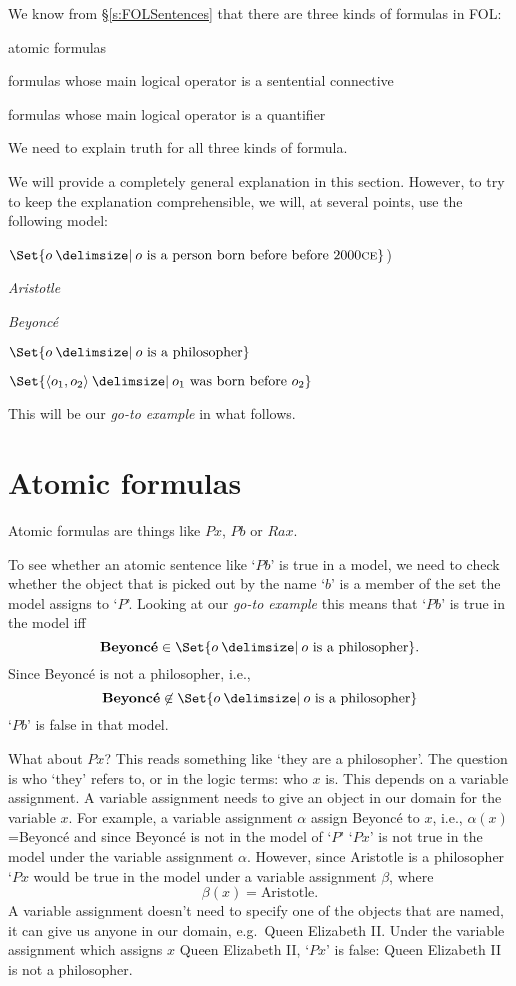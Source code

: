 We know from \S\ref{s:FOLSentences} that there are three kinds of formulas in FOL:
	\begin{ebullet}
		\item atomic formulas
		\item formulas whose main logical operator is a sentential connective
		\item formulas whose main logical operator is a quantifier
	\end{ebullet}
We need to explain truth for all three kinds of formula.

We will provide a completely general explanation in this section. However, to try to keep the explanation comprehensible, we will, at several points, use the following model:
	\begin{interp}
		\item[\domain]$\Set{o \given o\text{ is a person born before before 2000\textsc{ce}}}$)
		\item[\denote{a}] \emph{Aristotle}
		\item[\denote{b}] \emph{Beyonc\'e}
		\item[\denote{P}] $\Set{o \given o\text{ is a philosopher}}$
		\item[\denote{R}] $\Set{\langle o_1,o_2\rangle \given o_1\text{ was born before }o_2}$
	\end{interp}
This will be our \emph{go-to example} in what follows.
%
\section{Atomic formulas}\label{s:traf}
Atomic formulas are things like $Px$, $Pb$ or $Rax$.

To see whether an atomic sentence like `$Pb$' is true in a model, we need to check whether the object that is picked out by the name `$b$' is a member of the set the model assigns to `$P$'. Looking at our \emph{go-to example} this means that `$Pb$' is true in the model iff $$\text{\emph{Beyonc\'e}}\in\Set{o \given o\text{ is a philosopher}}.$$
Since Beyonc\'e is not a philosopher, i.e., 
$$\text{\emph{Beyonc\'e}}\not\in\Set{o \given o\text{ is a philosopher}}$$
`$Pb$' is false in that model.


What about $Px$? This reads something like `they are a philosopher'. The question is who `they' refers to, or in the logic terms: who $x$ is. This depends on a variable assignment. A variable assignment needs to give an object in our domain for the variable $x$. For example, a variable assignment $\alpha$  assign Beyonc\'e to $x$, i.e., $\alpha(x)$=Beyonc\'e and since Beyonc\'e is not in the model of `$P$' `$Px$' is not true in the model under the variable assignment $\alpha$. However, since Aristotle is a philosopher `$Px$ would be true in the model under a variable assignment $\beta$, where $$\beta(x)=\text{Aristotle}.$$
A variable assignment doesn't need to specify one of the objects that are named, it can give us anyone in our domain, e.g.~Queen Elizabeth II. Under the variable assignment which assigns $x$ Queen Elizabeth II, `$Px$' is false: Queen Elizabeth II is not a philosopher.

